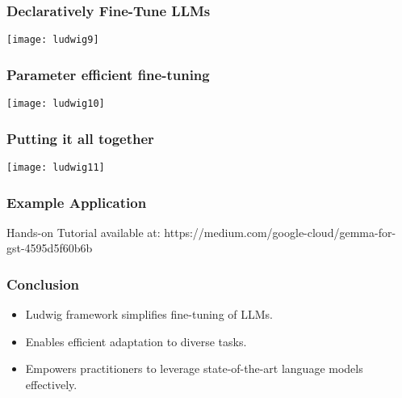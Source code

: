 \begin{frame}[fragile]\frametitle{Declaratively Fine-Tune LLMs}

		\begin{center}
		\texttt{[image: ludwig9]}
		\end{center}

\end{frame}

\begin{frame}[fragile]\frametitle{Parameter efficient fine-tuning}

		\begin{center}
		\texttt{[image: ludwig10]}
		\end{center}

\end{frame}

\begin{frame}[fragile]\frametitle{Putting it all together}

		\begin{center}
		\texttt{[image: ludwig11]}
		\end{center}

\end{frame}

\begin{frame}[fragile]\frametitle{Example Application}

Hands-on Tutorial available at: https://medium.com/google-cloud/gemma-for-gst-4595d5f60b6b

\end{frame}

\begin{frame}[fragile]\frametitle{Conclusion}
    \begin{itemize}
        \item Ludwig framework simplifies fine-tuning of LLMs.
        \item Enables efficient adaptation to diverse tasks.
        \item Empowers practitioners to leverage state-of-the-art language models effectively.
    \end{itemize}
\end{frame}
